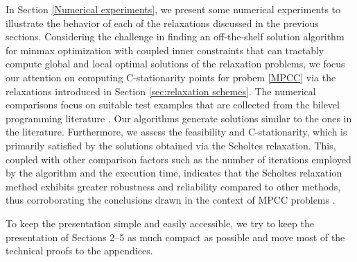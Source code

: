 In Section \ref{Numerical experiments}, we present some numerical experiments to illustrate the behavior of each of the relaxations discussed in the previous sections. Considering the challenge in finding an off-the-shelf solution algorithm for minmax optimization with coupled inner constraints that can tractably compute global and local optimal solutions of the relaxation problems, we focus our attention on computing C-stationarity points for probem \eqref{MPCC} via the relaxations introduced in Section \ref{sec:relaxation schemes}. The numerical comparisons focus on suitable test examples that are collected from the bilevel programming literature  \cite{Mitsos2006,WiesemannTsoukalasKleniatiRustem2013}. Our algorithms generate solutions similar to the ones in the literature. Furthermore, we assess the feasibility and C-stationarity, which is primarily satisfied by the solutions obtained via the Scholtes relaxation. This, coupled with other comparison factors such as the number of iterations employed by the algorithm and the execution time, indicates that the Scholtes relaxation method exhibits greater robustness and reliability compared to other methods, thus corroborating the conclusions drawn in the context   {of} MPCC problems  \cite{HoheiselEtAlComparison2013}.  




To keep the presentation simple and easily accessible, we try to keep the presentation of Sections 2--5 as much compact as possible and move most of the technical proofs to the appendices. 







